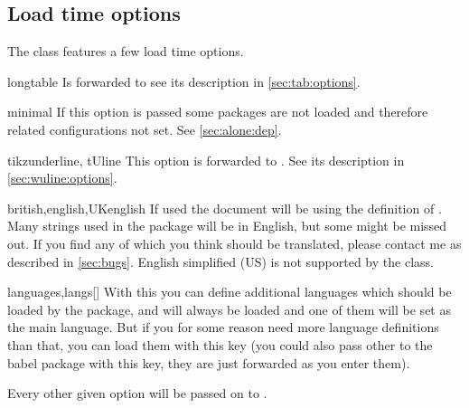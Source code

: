 \subsection{Load time options}\label{sec:alone:options}%
The class features a few load time options.
\begin{describeopt}{longtable}
  Is forwarded to  see its description in \autoref{sec:tab:options}.
\end{describeopt}
\begin{describeopt}{minimal}
  If this option is passed some packages are not loaded and therefore related
  configurations not set. See \autoref{sec:alone:dep}.
\end{describeopt}
\begin{describeopt}{tikzunderline, tUline}
  This option is forwarded to . See its description in
  \autoref{sec:wuline:options}.
\end{describeopt}
\begin{describeopt}{british,english,UKenglish}
  If used the document will be using the  definition of
  . Many strings used in the package will be in English, but some
  might be missed out. If you find any of which you think should be translated,
  please contact me as described in \autoref{sec:bugs}. English simplified (US)
  is not supported by the class.
\end{describeopt}
\begin{describeopt}{languages,langs}[]
  With this you can define additional languages which should be loaded by the
   package,  and  will always be loaded and
  one of them will be set as the main language. But if you for some reason need
  more language definitions than that, you can load them with this key (you
  could also pass other  to the babel package with this key, they
  are just forwarded as you enter them).
\end{describeopt}


\noindent
Every other given option will be passed on to .
